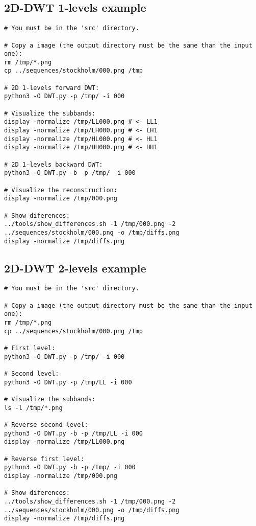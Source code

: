 \subsection{2D-DWT 1-levels example}
\begin{verbatim}
# You must be in the 'src' directory.

# Copy a image (the output directory must be the same than the input one):
rm /tmp/*.png
cp ../sequences/stockholm/000.png /tmp

# 2D 1-levels forward DWT:
python3 -O DWT.py -p /tmp/ -i 000

# Visualize the subbands:
display -normalize /tmp/LL000.png # <- LL1
display -normalize /tmp/LH000.png # <- LH1
display -normalize /tmp/HL000.png # <- HL1
display -normalize /tmp/HH000.png # <- HH1

# 2D 1-levels backward DWT:
python3 -O DWT.py -b -p /tmp/ -i 000

# Visualize the reconstruction:
display -normalize /tmp/000.png 

# Show diferences:
../tools/show_differences.sh -1 /tmp/000.png -2 ../sequences/stockholm/000.png -o /tmp/diffs.png
display -normalize /tmp/diffs.png
\end{verbatim}

\subsection{2D-DWT 2-levels example}
\begin{verbatim}
# You must be in the 'src' directory.

# Copy a image (the output directory must be the same than the input one):
rm /tmp/*.png
cp ../sequences/stockholm/000.png /tmp

# First level:
python3 -O DWT.py -p /tmp/ -i 000

# Second level:
python3 -O DWT.py -p /tmp/LL -i 000

# Visualize the subbands:
ls -l /tmp/*.png

# Reverse second level:
python3 -O DWT.py -b -p /tmp/LL -i 000
display -normalize /tmp/LL000.png

# Reverse first level:
python3 -O DWT.py -b -p /tmp/ -i 000
display -normalize /tmp/000.png

# Show diferences:
../tools/show_differences.sh -1 /tmp/000.png -2 ../sequences/stockholm/000.png -o /tmp/diffs.png
display -normalize /tmp/diffs.png
\end{verbatim}


